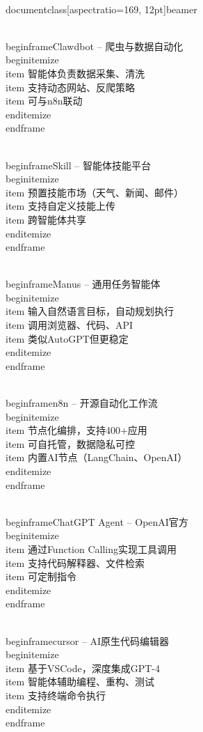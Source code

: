 \\documentclass[aspectratio=169, 12pt]{beamer}
\begin{document}
\\begin{frame}{Clawdbot – 爬虫与数据自动化}
\\begin{itemize}
    \\item 智能体负责数据采集、清洗
    \\item 支持动态网站、反爬策略
    \\item 可与n8n联动
\\end{itemize}
\\end{frame}

\\begin{frame}{Skill – 智能体技能平台}
\\begin{itemize}
    \\item 预置技能市场（天气、新闻、邮件）
    \\item 支持自定义技能上传
    \\item 跨智能体共享
\\end{itemize}
\\end{frame}

\\begin{frame}{Manus – 通用任务智能体}
\\begin{itemize}
    \\item 输入自然语言目标，自动规划执行
    \\item 调用浏览器、代码、API
    \\item 类似AutoGPT但更稳定
\\end{itemize}
\\end{frame}

\\begin{frame}{n8n – 开源自动化工作流}
\\begin{itemize}
    \\item 节点化编排，支持400+应用
    \\item 可自托管，数据隐私可控
    \\item 内置AI节点（LangChain、OpenAI）
\\end{itemize}
\\end{frame}

\\begin{frame}{ChatGPT Agent – OpenAI官方}
\\begin{itemize}
    \\item 通过Function Calling实现工具调用
    \\item 支持代码解释器、文件检索
    \\item 可定制指令
\\end{itemize}
\\end{frame}

\\begin{frame}{cursor – AI原生代码编辑器}
\\begin{itemize}
    \\item 基于VSCode，深度集成GPT-4
    \\item 智能体辅助编程、重构、测试
    \\item 支持终端命令执行
\\end{itemize}
\\end{frame}
\end{document}
